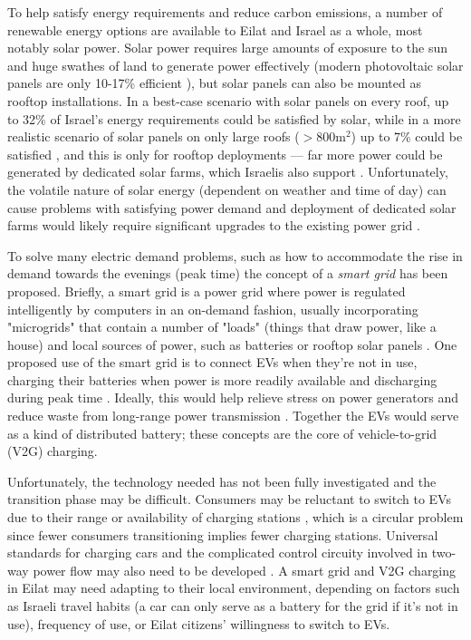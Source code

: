 \documentclass{article}                         %
\begin{document}
To help satisfy energy requirements and reduce carbon emissions, a number of renewable energy options are available to Eilat and Israel as a whole, most notably solar power. Solar power requires large amounts of exposure to the sun and huge swathes of land to generate power effectively (modern photovoltaic solar panels are only 10-17\% efficient \cite{Zhu2015DistributedGrid}), but solar panels can also be mounted as rooftop installations. In a best-case scenario with solar panels on every roof, up to 32\% of Israel's energy requirements could be satisfied by solar, while in a more realistic scenario of solar panels on only large roofs ($>$800m$^2$) up to 7\% could be satisfied \cite{Vardimon2011AssessmentIsrael}, and this is only for rooftop deployments --- far more power could be generated by dedicated solar farms, which Israelis also support \cite{Dipersio2018PhotovoltaicAcceptance}. Unfortunately, the volatile nature of solar energy (dependent on weather and time of day) can cause problems with satisfying power demand \cite{Lu2015IntroductionPEVs} and deployment of dedicated solar farms would likely require significant upgrades to the existing power grid \cite{Vardimon2011AssessmentIsrael}.

To solve many electric demand problems, such as how to accommodate the rise in demand towards the evenings (peak time) the concept of a \textit{smart grid} has been proposed. Briefly, a smart grid is a power grid where power is regulated intelligently by computers in an on-demand fashion, usually incorporating "microgrids" that contain a number of "loads" (things that draw power, like a house) and local sources of power, such as batteries or rooftop solar panels \cite{Lu2015IntroductionPEVs}. One proposed use of the smart grid is to connect EVs when they're not in use, charging their batteries when power is more readily available and discharging during peak time \cite{Mahmud2015PowerEV}. Ideally, this would help relieve stress on power generators and reduce waste from long-range power transmission \cite{Zhu2015DistributedGrid}. Together the EVs would serve as a kind of distributed battery; these concepts are the core of vehicle-to-grid (V2G) charging.

Unfortunately, the technology needed has not been fully investigated and the transition phase may be difficult. Consumers may be reluctant to switch to EVs due to their range or availability of charging stations \cite{Zhu2015DistributedGrid}, which is a circular problem since fewer consumers transitioning implies fewer charging stations. Universal standards for charging cars and the complicated control circuity involved in two-way power flow may also need to be developed \cite{Ustun2015ImpactSystems, Yeshayahou2011IsraelCharging}. A smart grid and V2G charging in Eilat may need adapting to their local environment, depending on factors such as Israeli travel habits (a car can only serve as a battery for the grid if it's not in use), frequency of use, or Eilat citizens' willingness to switch to EVs.
\end{document}
